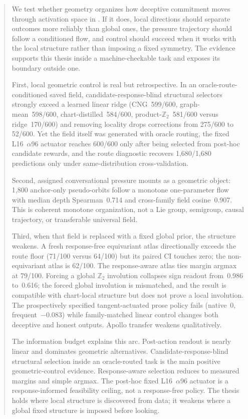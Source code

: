 \begin{abstract}
We test whether geometry organizes how deceptive commitment moves through activation space in
\model{}. If it does, local directions should separate outcomes more reliably than global ones,
the pressure trajectory should follow a conditioned flow, and control should succeed when it works
with the local structure rather than imposing a fixed symmetry. The evidence supports this thesis
inside a machine-checkable task and exposes its boundary outside one.

First, local geometric control is real but retrospective. In an oracle-route-conditioned saved
field, candidate-response-blind structural selectors strongly exceed a learned linear ridge
(CNG~599/600, graph-mean~598/600, chart-distilled~584/600, product-$\mathbb{Z}_2$~581/600 versus
ridge~170/600)
and removing locality drops corrections from 275/600 to 52/600. Yet the field itself was generated
with oracle routing, the fixed L16~$\alpha$96 actuator reaches 600/600 only after being selected
from post-hoc candidate rewards, and the route diagnostic recovers 1,680/1,680
predictions only under same-distribution cross-validation.

Second, assigned conversational pressure mounts as a geometric object: 1,800 anchor-only
pseudo-orbits follow a monotone one-parameter flow with median depth Spearman~0.714
and cross-family field cosine~0.907. This is coherent monotone organization, not a Lie group,
semigroup, causal trajectory, or transferable universal field.

Third, when that field is replaced with a fixed global prior, the structure weakens. A fresh
response-free equivariant atlas directionally exceeds the route floor (71/100 versus 64/100) but
its paired CI touches zero; the non-equivariant atlas is 62/100. The response-aware atlas ties
margin argmax at 79/100. Forcing a global $\mathbb{Z}_2$ involution collapses sign readout
from~0.986 to~0.616; the forced global involution is mismatched, and the result is compatible
with chart-local structure but does not prove a local involution. The prospectively specified
tangent-actuated prose policy fails (native~0, frequent~$-0.083$) while family-matched linear
control changes both deceptive and honest outputs. Apollo transfer weakens qualitatively.

The information budget explains this arc. Post-action readout is nearly linear and dominates
geometric alternatives. Candidate-response-blind structural selection inside an oracle-routed task
is the main positive geometric-control evidence. Response-aware selection reduces to measured
margins and simple argmax. The post-hoc fixed L16~$\alpha$96 actuator is a response-informed
feasibility ceiling, not a response-free policy. The thesis holds where local structure is
discovered from data; it weakens where a global fixed structure is imposed before looking.
\end{abstract}
